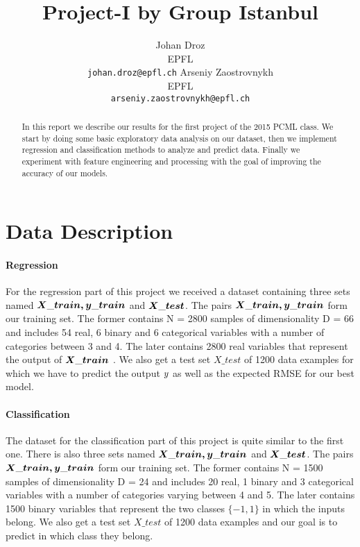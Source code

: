 \documentclass{article} %
\title{Project-I by Group Istanbul}
\author{
Johan Droz\\
EPFL \\
\texttt{johan.droz@epfl.ch} \And
Arseniy Zaostrovnykh\\
EPFL \\
\texttt{arseniy.zaostrovnykh@epfl.ch}
}
\begin{document}
\maketitle

\begin{abstract}
In this report we describe our results for the first project of the 2015 PCML class.
We start by doing some basic exploratory data analysis on our dataset, then we implement regression and classification methods to analyze and predict data.
Finally we experiment with feature engineering and processing with the goal of improving the accuracy of our models.
\end{abstract}

\section{Data Description}

\paragraph{Regression} For the regression part of this project we received a dataset containing three sets named $\boldmath{X\_train, y\_train}$ and $\boldmath{X\_test}$. The pairs $\boldmath{X\_train, y\_train}$  form our training set. 
The former contains N = 2800 samples of dimensionality D = 66 and includes 54 real, 6 binary and 6 categorical variables with a number of categories between 3 and 4.
The later contains 2800 real variables that represent the output of $\boldmath{X\_train}$ .
We also get a test set $X\_test$ of 1200 data examples for which we have to predict the output $\boldmath{y}$ as well as the expected RMSE for our best model.

\paragraph{Classification} The dataset for the classification part of this project is quite similar to the first one.
There is also three sets named $\boldmath{X\_train, y\_train}$ and $\boldmath{X\_test}$. 
The pairs $\boldmath{X\_train, y\_train}$  form our training set. 
The former contains N = 1500 samples of dimensionality D = 24 and includes 20 real, 1 binary and 3 categorical variables with a number of categories varying between 4 and 5.
The later contains 1500 binary variables that represent the two classes $\{-1, 1\}$ in which the inputs belong.
We also get a test set $X\_test$ of 1200 data examples and our goal is to predict in which class they belong.
\end{document}
